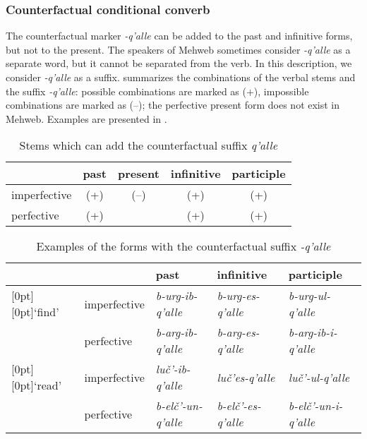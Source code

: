﻿\documentclass[output=paper]{langsci/langscibook}
\begin{document}
\subsubsection{Counterfactual conditional converb}\label{counterfactual-conditional-converb}


The counterfactual marker \emph{-q'alle} can be added to the past and
infinitive forms, but not to the present. The speakers of Mehweb
sometimes consider \emph{-q'alle} as a separate word, but it cannot be
separated from the verb. In this description, we consider \emph{-q'alle}
as a suffix.  summarizes the combinations of the verbal stems and
the suffix \emph{-q'alle}: possible combinations are marked as (+),
impossible combinations are marked as (–); the perfective present form does not exist in Mehweb.
Examples are presented in .

\begin{table}[h]
 \caption{Stems which can add the counterfactual suffix \emph{q'alle}}\label{tab:5:6}
 
\begin{tabular}{@{}lcccc@{}}
\toprule
& past & present & infinitive & participle\tabularnewline \midrule
imperfective & (+) & (–) & (+) & (+)\tabularnewline
perfective & (+) & & (+) & (+)\tabularnewline
\bottomrule
\end{tabular}
\end{table}


\begin{table}[b]
 \caption{Examples of the forms with the counterfactual suffix \emph{-q'alle}}\label{tab:5:7}

\begin{tabular}{@{}lllll@{}}
\toprule
& & past & infinitive & participle\tabularnewline \midrule
\raisebox{-6pt}[0pt][0pt]{`find'} & imperfective & \emph{b-urg-ib-q'alle} & \emph{b-urg-es-q'alle}
& \emph{b-urg-ul-q'alle}\tabularnewline
& perfective & \emph{b-arg-ib-q'alle} & \emph{b-arg-es-q'alle} &
                                                                 \emph{b-arg-ib-i-q'alle}\\ \midrule
 \raisebox{-6pt}[0pt][0pt]{`read'} & imperfective & \emph{luč'-ib-q'alle} & \emph{luč'es-q'alle} &
\emph{luč'-ul-q'alle}\\
& perfective & \emph{b-elč'-un-q'alle} & \emph{b-elč'-es-q'alle} &
\emph{b-elč'-un-i-q'alle}\\
\bottomrule
\end{tabular}
\end{table}
\end{document}
